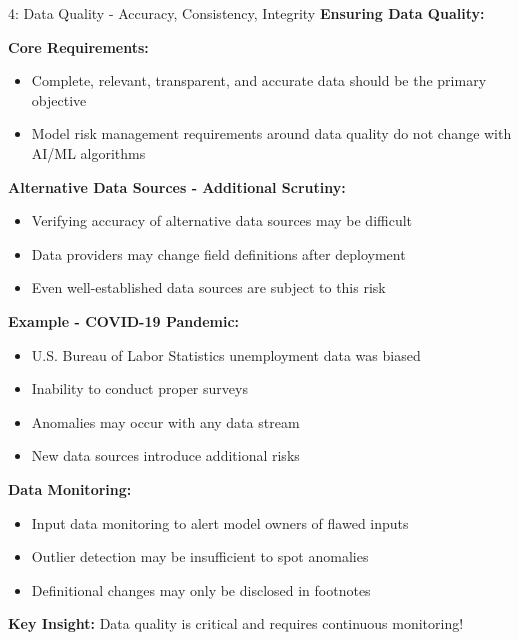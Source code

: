 \documentclass[8pt]{beamer}
\begin{document}
	\begin{frame}{4: Data Quality - Accuracy, Consistency, Integrity}
		\fontsize{6.5}{7.5}\selectfont
		\textbf{Ensuring Data Quality:}
		
		\vspace{0.1cm}
		\textbf{Core Requirements:}
		\begin{itemize}
			\item Complete, relevant, transparent, and accurate data should be the primary objective
			\item Model risk management requirements around data quality do not change with AI/ML algorithms
		\end{itemize}
		
		\vspace{0.1cm}
		\textbf{Alternative Data Sources - Additional Scrutiny:}
		\begin{itemize}
			\item Verifying accuracy of alternative data sources may be difficult
			\item Data providers may change field definitions after deployment
			\item Even well-established data sources are subject to this risk
		\end{itemize}
		
		\vspace{0.1cm}
		\textbf{Example - COVID-19 Pandemic:}
		\begin{itemize}
			\item U.S. Bureau of Labor Statistics unemployment data was biased
			\item Inability to conduct proper surveys
			\item Anomalies may occur with any data stream
			\item New data sources introduce additional risks
		\end{itemize}
		
		\vspace{0.1cm}
		\textbf{Data Monitoring:}
		\begin{itemize}
			\item Input data monitoring to alert model owners of flawed inputs
			\item Outlier detection may be insufficient to spot anomalies
			\item Definitional changes may only be disclosed in footnotes
		\end{itemize}
		
		\textcolor{myblue}{\textbf{Key Insight:}} Data quality is \textcolor{myblue}{critical and requires continuous monitoring}!
	\end{frame}
	
\end{document}
